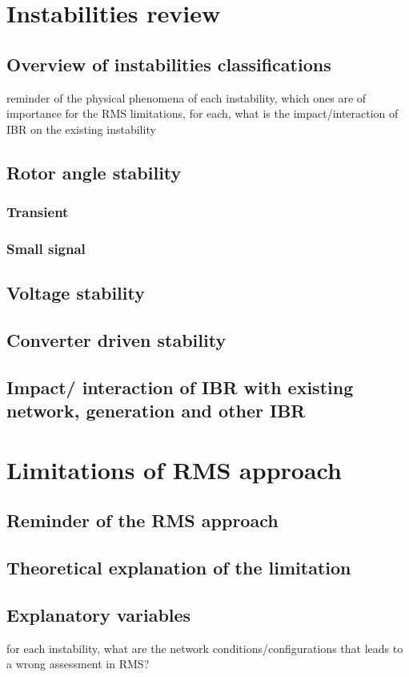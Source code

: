 \documentclass{report}
\begin{document}
\chapter{Instabilities review}
\section{Overview of instabilities classifications}
reminder of the physical phenomena of each instability, 
which ones are of importance for the RMS limitations, 
for each, what is the impact/interaction of IBR on the existing instability
\section{Rotor angle stability}
\subsection{Transient}
\subsection{Small signal}

\section{Voltage stability}

\section{Converter driven stability}
\section{Impact/ interaction of IBR with existing network, generation and other IBR}


\chapter{Limitations of RMS approach}
\section{Reminder of the RMS approach}
\section{Theoretical explanation of the limitation}
\section{Explanatory variables}
for each instability, what are the network conditions/configurations that leads to a wrong assessment in RMS?
\end{document}
